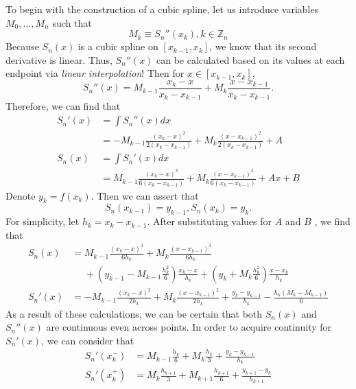 \documentclass{article}
\begin{document}
To begin with the construction of a cubic spline, let us introduce variables $M_0, \ldots, M_n$ such that
\[
    M_k\equiv S_n''(x_k), k\in \mathbb{Z}_n
\]
Because $S_n(x)$ is a cubic spline on $[x_{k-1}, x_k]$, we know that its second derivative is linear. Thus, $S_n''(x)$ can be calculated based on its values at each endpoint via \textit{linear interpolation}! Then for $x\in[x_{k-1}, x_k]$,
\begin{equation}
    S_n''(x) = M_{k-1}\frac{x_k-x}{x_k-x_{k-1}}+M_k\frac{x-x_{k-1}}{x_k-x_{k-1}}.
\end{equation}
Therefore, we can find that
\begin{align*}
    S_n'(x) & = \int S_n''(x)dx                                                                            \\
            & = -M_{k-1}\frac{(x_k-x)^2}{2(x_k-x_{k-1})} + M_k\frac{(x-x_{k-1})^2}{2(x_k-x_{k-1})} + A     \\
    S_n(x)  & = \int S_n'(x)dx                                                                             \\
            & = M_{k-1}\frac{(x_k-x)^3}{6(x_k-x_{k-1})} + M_k\frac{(x-x_{k-1})^3}{6(x_k-x_{k-1})} + Ax + B
\end{align*}
Denote $y_k=f(x_k)$. Then we can assert that
\[
    S_n(x_{k-1})=y_{k-1}, S_n(x_k)=y_k.
\]
For simplicity, let $h_k=x_k-x_{k-1}$. After substituting values for $A$ and $B$ \cite{Jameson}, we find that
\begin{align}
    S_n(x)  & = M_{k-1}\frac{(x_k-x)^3}{6h_k} + M_k\frac{(x-x_{k-1})^3}{6h_k} \nonumber                                                         \\
            & \phantom{=} + \left(y_{k-1}-M_{k-1}\frac{h_k^2}{6}\right)\frac{x_k-x}{h_k} + \left(y_k+M_k\frac{h_k^2}{6}\right)\frac{x-x_k}{h_k} \\
    S_n'(x) & = -M_{k-1}\frac{(x_k-x)^2}{2h_k} + M_k\frac{(x-x_{k-1})^2}{2h_k} + \frac{y_k-y_{k-1}}{h_k} - \frac{h_k(M_k-M_{k-1})}{6}
    \label{eq:first_derivative_cubic}
\end{align}
As a result of these calculations, we can be certain that both $S_n(x)$ and $S_n''(x)$ are continuous even across points. In order to acquire continuity for $S_n'(x)$, we can consider that
\begin{align*}
    S_n'(x_k^-) & = M_{k-1}\frac{h_k}{6}+M_k\frac{h_k}{3}+\frac{y_k-y_{k-1}}{h_k}             \\
    S_n'(x_k^+) & = M_k\frac{h_{k+1}}{3}+M_{k+1}\frac{h_{k+1}}{6}+\frac{y_{k+1}-y_k}{h_{k+1}}
\end{align*}
\end{document}
